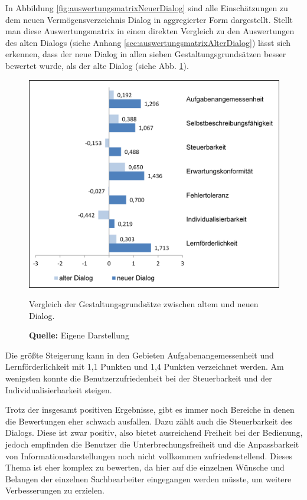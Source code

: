In Abbildung \ref{fig:auswertungsmatrixNeuerDialog} sind alle Einschätzungen zu dem neuen Vermögensverzeichnis Dialog in aggregierter Form dargestellt. Stellt man diese Auswertungsmatrix in einen direkten Vergleich zu den Auswertungen des alten Dialogs (siehe Anhang \ref{sec:auswertungsmatrixAlterDialog}) lässt sich erkennen, dass der neue Dialog in allen sieben Gestaltungsgrundsätzen besser bewertet wurde, als der alte Dialog (siehe Abb. \ref{fig:vergleichBalkendiagramm}). 
\begin{figure}[H]
  \centering
  \includegraphics[]{img/ISO9241-10_Vergleich_Balkendiagramm.PNG}
  \caption{Vergleich der Gestaltungsgrundsätze zwischen altem und neuen Dialog.}
  \caption*{\textbf{Quelle:} Eigene Darstellung}
  \label{fig:vergleichBalkendiagramm}
\end{figure}
Die größte Steigerung kann in den Gebieten Aufgabenangemessenheit und Lernförderlichkeit mit 1,1 Punkten und 1,4 Punkten verzeichnet werden. Am wenigsten konnte die Benutzerzufriedenheit bei der Steuerbarkeit und der Individualisierbarkeit steigen. 

Trotz der insgesamt positiven Ergebnisse, gibt es immer noch Bereiche in denen die Bewertungen eher schwach ausfallen. Dazu zählt auch die Steuerbarkeit des Dialogs. Diese ist zwar positiv, also bietet ausreichend Freiheit bei der Bedienung, jedoch empfinden die Benutzer die Unterbrechungsfreiheit und die Anpassbarkeit von Informationsdarstellungen noch nicht vollkommen zufriedenstellend. Dieses Thema ist eher komplex zu bewerten, da hier auf die einzelnen Wünsche und Belangen der einzelnen Sachbearbeiter eingegangen werden müsste, um weitere Verbesserungen zu erzielen.

